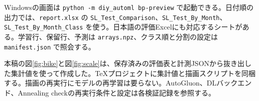 Windowsの画面は \texttt{python -m diy\_automl bp-preview} で起動できる。日付順の出力では、\texttt{report.xlsx} の \texttt{SL\_Test\_Comparison}、\texttt{SL\_Test\_By\_Month}、\texttt{SL\_Test\_By\_Month\_Class} を使う。日本語の評価Excelにも対応するシートがある。学習行、保留行、予測は \texttt{arrays.npz}、クラス順と分割の設定は \texttt{manifest.json} で照会する\cite{audit,milestone}。

本稿の図\ref{fig:bike}と図\ref{fig:scale}は、保存済みの評価表と計測JSONから抜き出した集計値を使って作成した。TeXプロジェクトに集計値と描画スクリプトを同梱する。描画の再実行にモデルの再学習は要らない。AutoGluon、DLバックエンド、Annealing checkの再実行条件と設定は各検証記録を参照する\cite{agcheck,dlcheck,annealing,scalebench}。
